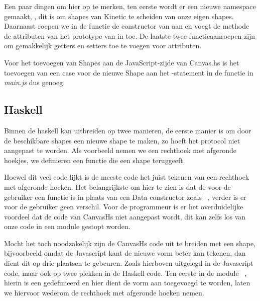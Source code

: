 Een paar dingen om hier op te merken, ten eerste wordt er een nieuwe namespace gemaakt, , dit is om shapes van Kinetic te scheiden van onze eigen shapes. Daarnaast roepen we in de  functie de constructor van  aan en voegt de  methode de attributen van het prototype van  in  toe. De laatste twee functieaanroepen zijn om gemakkelijk getters en setters toe te voegen voor attributen.

Voor het toevoegen van Shapes aan de JavaScript-zijde van Canvas.hs is het toevoegen van een case voor de nieuwe Shape aan het -statement in de  functie in \emph{main.js} dus genoeg.

\subsection{Haskell}

Binnen de haskell kan uitbreiden op twee manieren, de eerste manier is om door de beschikbare shapes een nieuwe shape te maken, zo hoeft het protocol niet aangepast te worden. Als voorbeeld nemen we een rechthoek met afgeronde hoekjes, we definieren een functie  die een shape teruggeeft.



Hoewel dit veel code lijkt is de meeste code het juist tekenen van een rechthoek met afgeronde hoeken. Het belangrijkste om hier te zien is dat de  voor de gebruiker een functie is in plaats van een Data constructor zoals ~, verder is er voor de gebruiker geen verschil. Voor de programmeur is er het overduidelijke voordeel dat de code van CanvasHs niet aangepast wordt, dit kan zelfs los van onze code in een module gestopt worden.

Mocht het toch noodzakelijk zijn de CanvasHs code uit te breiden met een shape, bijvoorbeeld omdat de Javascript kant de nieuwe vorm beter kan tekenen, dan dient dit op drie plaatsen te gebeuren. Zoals hierboven uitgelegd in de Javascript code, maar ook op twee plekken in de Haskell code. Ten eerste in de module ~, hierin is een  gedefinieerd en hier dient de vorm aan toegevoegd te worden, laten we hiervoor wederom de rechthoek met afgeronde hoeken nemen.

